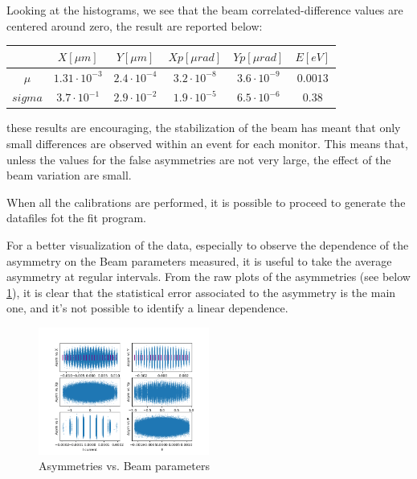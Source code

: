 Looking at the histograms, we see that the beam correlated-difference values are centered around zero, the result are reported below:

\begin{center}
\begin{tabular}{|c|c|c|c|c|c|}
\hline 
\rule[-1ex]{0pt}{2.5ex} & $X [\mu m]$ & $Y[\mu m]$ & $Xp [\mu rad]$ & $Yp [\mu rad]$ & $E [eV]$ \\ 
\hline 
\rule[-1ex]{0pt}{2.5ex} $\mu$ & $1.31 \cdot 10^{-3}$ & $2.4 \cdot 10^{-4}$ & $3.2 \cdot 10^{-8} $ & $3.6 \cdot 10^{-9}$ & $0.0013$ \\ 
\hline 
\rule[-1ex]{0pt}{2.5ex} $sigma$ & $3.7 \cdot 10^{-1}$ & $2.9 \cdot 10^{-2}$ & $ 1.9 \cdot 10^{-5} $ & $6.5 \cdot 10^{-6}$ & $0.38$ \\ 
\hline 
\end{tabular} 
\end{center}

these results are encouraging, the stabilization of the beam has meant that only small differences are observed within an event for each monitor. This means that, unless the values for the false asymmetries are not very large, the effect of the beam variation are small.

When all the calibrations are performed, it is possible to proceed to generate the datafiles fot the fit program.

For a better visualization of the data, especially to observe the dependence of the asymmetry on the Beam parameters measured, it is useful to take the average asymmetry at regular intervals. From the raw plots of the asymmetries (see below \ref{fig:asyvsparam}), it is clear that the statistical error associated to the asymmetry is the main one, and it's not possible to identify a linear dependence.

\begin{figure}[hbtp]
\centering
\includegraphics[width = 0.5\textwidth]{Analysis/Asym_vs_monitor.png}
\caption{Asymmetries vs. Beam parameters}
\label{fig:asyvsparam}
\end{figure}

